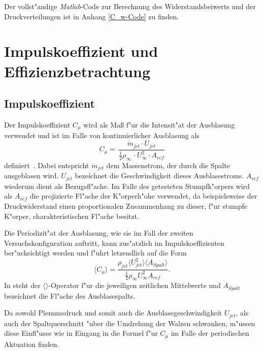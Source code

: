 Der vollst"andige \textit{Matlab}-Code zur Berechnung des Widerstandsbeiwerts und der Druckverteilungen ist in Anhang \ref{C_w-Code} zu finden. 

\section{Impulskoeffizient und Effizienzbetrachtung}

\subsection{Impulskoeffizient}
Der Impulskoeffizient $C_{\mu}$ wird als Ma\ss{} f"ur die Intensit"at der Ausblasung verwendet und ist im Falle von kontinuierlicher Ausblasung als 
\begin{equation}
	\label{eq: Def-momentum-coeff}
	C_{\mu} = \,\frac{\dot{m}_{jet} \cdot U_{jet}}{\frac{1}{2}\rho_{\infty}\, \cdot U^2_{\infty} \cdot A_{ref}}
\end{equation}
definiert~\cite{ElSayedM..2018}. 
Dabei entspricht $\dot{m}_{jet}$ dem Massenstrom, der durch die Spalte ausgeblasen wird. $U_{jet}$ bezeichnet die Geschwindigkeit dieses Ausblasestroms.
$A_{ref}$ wiederum dient als Bezugsfl"ache. Im Falle des getesteten Stumpfk"orpers wird als $A_{ref}$ die projizierte Fl"ache der K"orperh"ohe verwendet, da beispielsweise der Druckwiderstand einen proportionalen Zusammenhang zu dieser, f"ur stumpfe K"orper, charakteristischen Fl"ache besitzt.  %

Die Periodizit"at der Ausblasung, wie sie im Fall der zweiten Versuchskonfiguration auftritt, kann zus"atzlich im Impulskoeffizienten ber"ucksichtigt werden und f"uhrt letzendlich auf die Form \cite{Chabert.2014}
\begin{equation}
	\label{eq:momentum-coeff-oscill}
	\langle{C_{\mu}}\rangle = \frac{\rho_{jet}\langle{U^2_{jet}}\rangle \langle{A_{Spalt}}\rangle} {\frac{1}{2}\rho_{\infty}U^2_{\infty}A_{ref}}.	
\end{equation}
In  steht der $\langle{}\rangle$-Operator f"ur die jeweiligen zeitlichen Mittelwerte und $A_{Spalt}$ bezeichnet die Fl"ache des Ausblasespalts.

Da sowohl Plenumsdruck und somit auch die Ausblasegeschwindigkeit $U_{jet}$, als auch der Spaltquerschnitt "uber die Umdrehung der Walzen schwanken, m"ussen diese Einfl"usse wie in  Eingang in die Formel f"ur $C_{\mu}$ im Falle der periodischen Aktuation finden.

